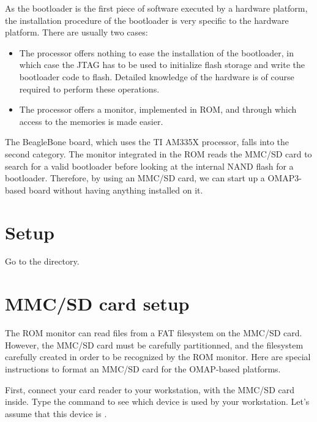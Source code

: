
As the bootloader is the first piece of software executed by a
hardware platform, the installation procedure of the bootloader is
very specific to the hardware platform. There are usually two cases:

\begin{itemize}

\item The processor offers nothing to ease the installation of the
  bootloader, in which case the JTAG has to be used to initialize
  flash storage and write the bootloader code to flash. Detailed
  knowledge of the hardware is of course required to perform these
  operations.

\item The processor offers a monitor, implemented in ROM, and through
  which access to the memories is made easier.

\end{itemize}
The BeagleBone board, which uses the TI AM335X processor, falls into
the second category. The monitor integrated in the ROM reads the MMC/SD
card to search for a valid bootloader before looking at the internal
NAND flash for a bootloader. Therefore, by using an MMC/SD card, we can
start up a OMAP3-based board without having anything installed on it.

\section{Setup}

Go to the  directory.

\section{MMC/SD card setup}

The ROM monitor can read files from a FAT filesystem on the MMC/SD
card. However, the MMC/SD card must be carefully partitionned, and the
filesystem carefully created in order to be recognized by the ROM
monitor. Here are special instructions to format an MMC/SD card
for the OMAP-based platforms.

First, connect your card reader to your workstation, with the MMC/SD
card inside. Type the  command to see which device is used
by your workstation. Let's assume that this device is .

